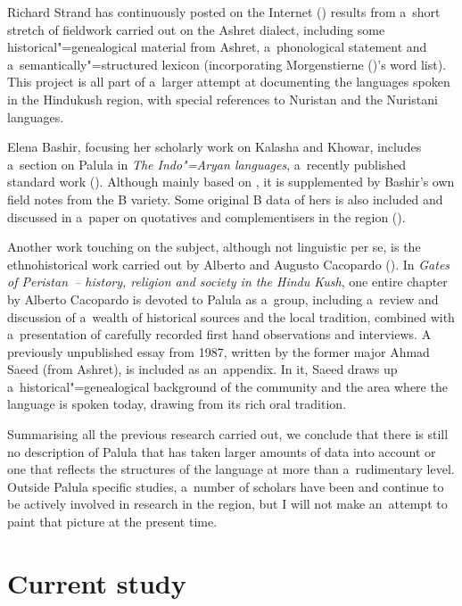 Richard Strand has continuously posted on the Internet (\citeyear{strand1997/2015})
results from a~short stretch of fieldwork carried out on the Ashret dialect, including
some historical"=genealogical material from Ashret, a~phonological statement and
a~semantically"=structured lexicon (incorporating Morgenstierne (\citeyear{morgenstierne1941})'s word list). This project is
all part of a~larger attempt at documenting the languages spoken in the Hindukush region, with
special references to Nuristan and the Nuristani languages.


Elena Bashir, focusing her scholarly work on Kalasha and Khowar, includes a~section on Palula in
\textit{The Indo"=Aryan languages}, a~recently published standard work
(\citeyear{bashir2003}). Although mainly based on \citet{morgenstierne1941}, it is supplemented by
Bashir's own field notes from the B variety. Some original B data of hers is also included and
discussed in a~paper on quotatives and complementisers in the region (\citeyear{bashir1996}).


Another work touching on the subject, although not linguistic per se, is the ethnohistorical work
carried out by Alberto and Augusto Cacopardo (\citeyear{cacopardo2001}). In \textit{Gates of
  Peristan~-- history, religion and society in the Hindu Kush}, one entire chapter by Alberto
Cacopardo is devoted to Palula as a~group, including a~review and discussion of a~wealth of
historical sources and the local tradition, combined with a~presentation of carefully recorded first
hand observations and interviews. A previously unpublished essay from 1987, written by the former
major Ahmad Saeed (from Ashret), is included as an~appendix. In it, Saeed draws up
a~historical"=genealogical background of the community and the area where the language is spoken
today, drawing from its rich oral tradition.

\largerpage
Summarising all the previous research carried out, we conclude that there is still no description of
Palula that has taken larger amounts of data into account or one that reflects the structures of the
language at more than a~rudimentary level. Outside Palula specific studies, a~number of scholars have been and continue to be actively involved
in research in the region, but I will not make an~attempt to paint that picture at the present time.


\section{Current study}
\label{sec:1-6}

